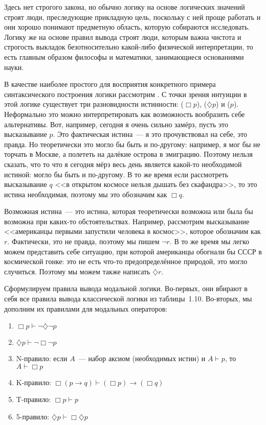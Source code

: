 Здесь нет строгого закона, но обычно логику на основе логических значений строят люди, преследующие прикладную цель, поскольку с ней проще работать и они хорошо понимают предметную область, которую собираются исследовать. Логику же на основе правил вывода строят люди, которым важна чистота и строгость выкладок безотносительно какой-либо физической интерпретации, то есть главным образом философы и математики, занимающиеся основаниями науки.

В качестве наиболее простого для восприятия конкретного примера синтаксического построения логики рассмотрим . С точки зрения интуиции в этой логике существует три разновидности истинности:  ($\Box p$),  ($\diamondsuit p$) и  ($p$). Неформально это можно интерпретировать как возможность вообразить себе альтернативы. Вот, например, сегодня я очень сильно замёрз, пусть это высказывание $p$. Это фактическая истина~--- я это прочувствовал на себе, это правда. Но теоретически это могло бы быть и по-другому: например, я мог бы не торчать в Москве, а полететь на далёкие острова в эмиграцию. Поэтому нельзя сказать, что то что я сегодня мёрз весь день является какой-то необходимой истиной: могло бы быть и по-другому. В то же время если рассмотреть высказывание $q$ <<в открытом космосе нельзя дышать без скафандра>>, то это истина необходимая, поэтому мы это обозначим как $\Box q$.

Возможная истина~--- это истина, которая теоретически возможна или была бы возможна при каких-то обстоятельствах. Например, рассмотрим высказывание <<американцы первыми запустили человека в космос>>, которое обозначим как $r$. Фактически, это не правда, поэтому мы пишем $\neg r$. В то же время мы легко можем представить себе ситуацию, при которой американцы обогнали бы СССР в космической гонке: это не есть что-то предопределённое природой, это могло случиться. Поэтому мы можем также написать $\diamondsuit r$. 

Сформулируем правила вывода модальной логики. Во-первых, они вбирают в себя все правила вывода классической логики из таблицы~1.10. Во-вторых, мы дополним их правилами для модальных операторов:

\begin{enumerate}
\item $\Box p \vdash \neg \diamondsuit \neg p$
\item $\diamondsuit p \vdash \neg \Box \neg p$
\item N-правило: если $A$~--- набор аксиом (необходимых истин) и $A\vdash p$, то $A\vdash \Box p$
\item K-правило: $\Box (p\to q) \vdash (\Box p) \to (\Box q)$
\item T-правило: $\Box p \vdash p$
\item 5-правило: $\diamondsuit p \vdash \Box \diamondsuit p$
\end{enumerate}

